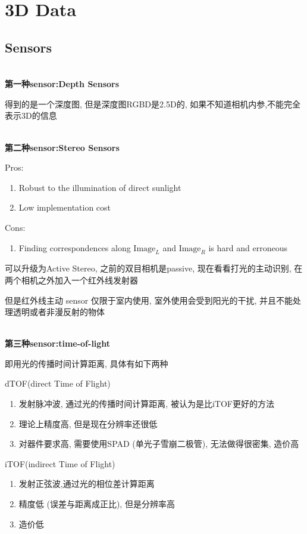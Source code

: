 \section{3D Data}

\subsection{Sensors}

\textbf{\\第一种sensor:Depth Sensors}

得到的是一个深度图, 但是深度图RGBD是2.5D的, 如果不知道相机内参,不能完全表示3D的信息

\textbf{\\第二种sensor:Stereo Sensors}

Pros:

\begin{enumerate}
    \item Robust to the illumination of direct sunlight
    \item Low implementation cost
\end{enumerate}

Cons:

\begin{enumerate}
    \item Finding correspondences along $\text{Image}_L$ and $\text{Image}_R$ is hard and erroneous
\end{enumerate}

可以升级为Active Stereo, 之前的双目相机是passive, 现在看看打光的主动识别, 在两个相机之外加入一个红外线发射器

但是红外线主动 sensor 仅限于室内使用, 室外使用会受到阳光的干扰, 并且不能处理透明或者非漫反射的物体

\textbf{\\第三种sensor:time-of-light}

即用光的传播时间计算距离, 具体有如下两种

dTOF(direct Time of Flight)
\begin{enumerate}
    \item 发射脉冲波, 通过光的传播时间计算距离, 被认为是比iTOF更好的方法
    \item 理论上精度高, 但是现在分辨率还很低
    \item 对器件要求高, 需要使用SPAD (单光子雪崩二极管), 无法做得很密集, 造价高
\end{enumerate}

iTOF(indirect Time of Flight)
\begin{enumerate}
    \item 发射正弦波,通过光的相位差计算距离
    \item 精度低 (误差与距离成正比), 但是分辨率高
    \item 造价低
\end{enumerate}


